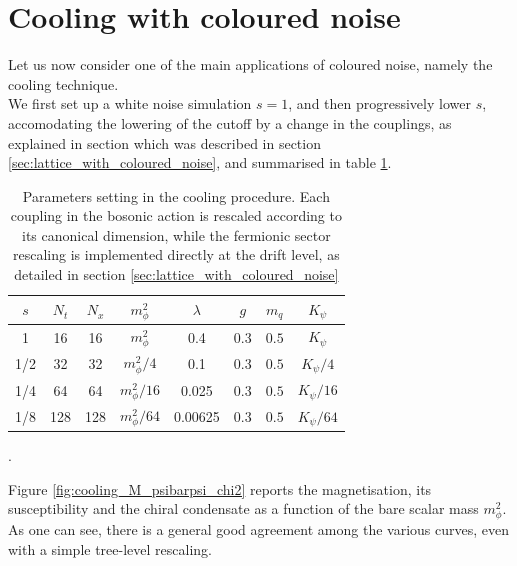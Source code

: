 \section{Cooling with coloured noise}
Let us now consider one of the main applications of coloured noise, namely the cooling technique. \\
We first set up a white noise simulation $s=1$, and then progressively lower $s$, accomodating the lowering of the cutoff by a change in the couplings, as explained in section  which was described in section \ref{sec:lattice_with_coloured_noise}, and summarised in table \ref{tab:params_cooling}.
\begin{table}[htp]
    \centering
    \begin{tabular}{cccccccc}
        \toprule
        $s$ & $N_t$ & $N_x$ & $m_\phi^2$ & $\lambda$ & $g$ & $m_q$& $K_\psi$ \\
        \midrule 
        1 & 16 & 16 & $m_\phi^2$ & 0.4 & 0.3 & $0.5$ & $K_\psi$ \\
        1/2 & 32 & 32 & $m_\phi^2/4$ & 0.1 & 0.3 & $0.5$ & $K_\psi/4$ \\
        1/4 & 64 & 64 & $m_\phi^2/16$ & 0.025 & 0.3 & $0.5$ & $K_\psi/16$ \\
        1/8 & 128 & 128 & $m_\phi^2/64$ & 0.00625 & 0.3 & $0.5$ & $K_\psi/64$ \\
        \bottomrule
    \end{tabular}
    \caption[Parameters cooling]{Parameters setting in the cooling procedure. Each coupling in the bosonic action is rescaled according to its canonical dimension, while the fermionic sector rescaling is implemented directly at the drift level, as detailed in section \ref{sec:lattice_with_coloured_noise}}.
    \label{tab:params_cooling}
\end{table}
Figure \ref{fig:cooling_M_psibarpsi_chi2} reports the magnetisation, its susceptibility and the chiral condensate as a function of the bare scalar mass $m_\phi^2$. As one can see, there is a general good agreement among the various curves, even with a simple tree-level rescaling.
